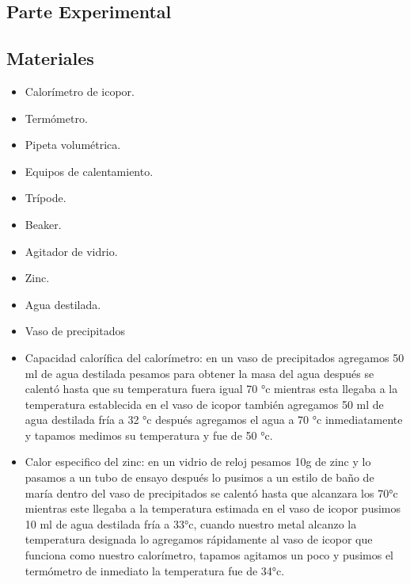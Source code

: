 \documentclass{article}
\begin{document}
\begin{multicols}{2}
\section{Parte Experimental}

\subsection{Materiales}

\begin{multicols}{2}
\begin{itemize}
    \item Calorímetro de icopor.                                
    \item Termómetro.
    \item 	Pipeta volumétrica.
    \item 	Equipos de calentamiento.
    \item 	Trípode.
    \item Beaker.
    \item 	Agitador de vidrio.
    \item Zinc.
    \item Agua destilada.
    \item Vaso de precipitados
    
    
\end{itemize}
\end{multicols}


\begin{itemize}
    \item 	Capacidad calorífica del calorímetro: en un vaso de precipitados agregamos 50 ml de agua destilada pesamos para obtener la masa del agua después se calentó hasta que su temperatura fuera igual 70 °c mientras esta llegaba a la temperatura establecida en el vaso de icopor también agregamos 50 ml de agua destilada fría a 32 °c después agregamos el agua a 70 °c inmediatamente y tapamos medimos su temperatura y fue de 50 °c. 
    
    \item Calor especifico del zinc: en un vidrio de reloj pesamos 10g de zinc y lo pasamos a un tubo de ensayo después lo pusimos a un estilo de baño de maría dentro del vaso de precipitados se calentó hasta que alcanzara los 70°c mientras este llegaba a la temperatura estimada en el vaso de icopor pusimos 10 ml de agua destilada fría a 33°c, cuando nuestro metal alcanzo la temperatura designada lo agregamos rápidamente al vaso de icopor que funciona como nuestro calorímetro, tapamos agitamos un poco y pusimos el termómetro de inmediato la temperatura fue de 34°c. 
    \end{itemize}
    

\end{multicols}
\end{document}
